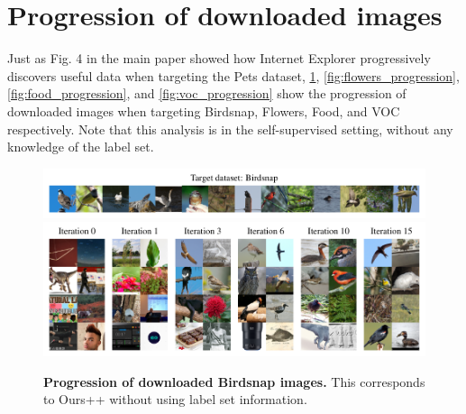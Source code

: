 



\section{Progression of downloaded images}
\label{sec:progression_downloaded_imgs}
Just as Fig. 4 in the main paper showed how Internet Explorer progressively discovers useful data when targeting the Pets dataset, \cref{fig:birdsnap_progression}, \cref{fig:flowers_progression}, \cref{fig:food_progression}, and \cref{fig:voc_progression} show the progression of downloaded images when targeting Birdsnap, Flowers, Food, and VOC respectively. Note that this analysis is in the self-supervised setting, without any knowledge of the label set. 

\begin{figure}
    \centering
    \includegraphics{figures/birdsnap_targets.pdf} \\
    \vspace{-0.8em}
    \includegraphics{figures/birdsnap-progression-1146-2col.pdf}
    \caption{\textbf{Progression of downloaded Birdsnap images.} This corresponds to Ours++ without using label set information. }
    \label{fig:birdsnap_progression}
\end{figure}

